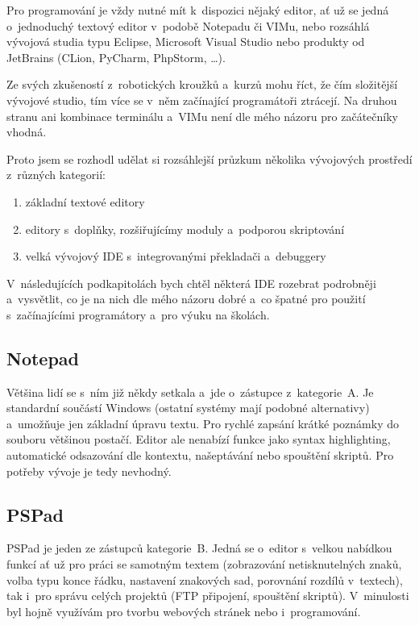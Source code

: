 Pro programování je vždy nutné mít k~dispozici nějaký editor, ať už se jedná o~jednoduchý textový editor v~podobě Notepadu či VIMu, nebo rozsáhlá vývojová studia typu Eclipse, Microsoft Visual Studio nebo produkty od JetBrains (CLion, PyCharm, PhpStorm, \dots).

Ze svých zkušeností z~robotických kroužků a~kurzů mohu říct, že čím složitější vývojové studio, tím více se v~něm začínající programátoři ztrácejí.
Na druhou stranu ani kombinace terminálu a~VIMu není dle mého názoru pro začátečníky vhodná.

Proto jsem se rozhodl udělat si rozsáhlejší průzkum několika vývojových prostředí z~různých kategorií: 

\begin{enumerate}[label=\Alph*)]
    \item základní textové editory
    \item editory s~doplňky, rozšiřujícímy moduly a~podporou skriptování
    \item velká vývojový IDE s~integrovanými překladači a~debuggery 
\end{enumerate}
V~následujících podkapitolách bych chtěl některá IDE rozebrat podrobněji a~vysvětlit, co je na nich dle mého názoru dobré a~co špatné pro použití s~začínajícími programátory a~pro výuku na školách.

\subsection{Notepad}


Většina lidí se s~ním již někdy setkala a~jde o~zástupce z~kategorie~A. 
Je standardní součástí Windows (ostatní systémy mají podobné alternativy) a~umožňuje jen základní úpravu textu.
Pro rychlé zapsání krátké poznámky do souboru většinou postačí.
Editor ale nenabízí funkce jako syntax highlighting, automatické odsazování dle kontextu, našeptávání nebo spouštění skriptů. 
Pro potřeby vývoje je tedy nevhodný. 

\subsection{PSPad}


PSPad je jeden ze zástupců kategorie~B. 
Jedná se o~editor s~velkou nabídkou funkcí ať už pro práci se samotným textem (zobrazování netisknutelných znaků, volba typu konce řádku, nastavení znakových sad, porovnání rozdílů v~textech), tak i~pro správu celých projektů (FTP připojení, spouštění skriptů).
V~minulosti byl hojně využívám pro tvorbu webových stránek nebo i~programování.

